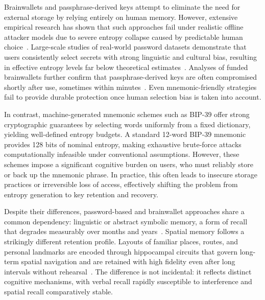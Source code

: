 \documentclass[journal,article,submit,pdftex,moreauthors]{Definitions/mdpi}
\newcommand{\add}[1]{#1}
\newcommand{\remove}[1]{}
\newcommand{\add}[1]{\added{#1}}
\newcommand{\remove}[1]{\deleted{#1}}
\begin{document}
Brainwallets and passphrase-derived keys attempt to eliminate the need for external storage by relying entirely on human memory. However, extensive empirical research has shown that such approaches fail under realistic offline attacker models due to severe entropy collapse caused by predictable human choice~\cite{Bonneau2012,Vasek2017}. Large-scale studies of real-world password datasets demonstrate that users consistently select secrets with strong linguistic and cultural bias, resulting in effective entropy levels far below theoretical estimates~\cite{Bonneau2012,Kuo2006}. Analyses of funded brainwallets further confirm that passphrase-derived keys are often compromised shortly after use, sometimes within minutes~\cite{Vasek2017,Yang2016}. Even mnemonic-friendly strategies fail to provide durable protection once human selection bias is taken into account.

In contrast, machine-generated mnemonic schemes such as BIP-39 offer strong cryptographic guarantees by selecting words uniformly from a fixed dictionary, yielding well-defined entropy budgets. A standard 12-word BIP-39 mnemonic provides 128 bits of nominal entropy, making exhaustive brute-force attacks computationally infeasible under conventional assumptions. However, these schemes impose a significant cognitive burden on users, who must reliably store or back up the mnemonic phrase. In practice, this often leads to insecure storage practices or irreversible loss of access, effectively shifting the problem from entropy generation to key retention and recovery.

\remove{A key limitation shared by most existing mnemonic systems is their dependence on linguistic or abstract symbolic memory, which is known to be fragile and error-prone over long time horizons~\cite{Pals2018,Akaygun2014}. In contrast, decades of research in cognitive psychology and neuroscience have established that humans possess a robust capacity for spatial memory. Spatial representations are encoded, organized, and retrieved using dedicated cognitive mechanisms centered around landmarks and reference frames, and are retained accurately even after long periods without rehearsal~\cite{Montello1998,McNamara2003,McNamara2012}. Neurobiological evidence further supports this distinction: the hippocampus plays a central role in both spatial navigation and long-term memory formation, suggesting a deep functional link between spatial awareness and memory encoding~\cite{McNaughton1991}.}\add{Despite their differences, password-based and brainwallet approaches share a common dependency: linguistic or abstract symbolic memory, a form of recall that degrades measurably over months and years~\cite{Pals2018,Akaygun2014}. Spatial memory follows a strikingly different retention profile. Layouts of familiar places, routes, and personal landmarks are encoded through hippocampal circuits that govern long-term spatial navigation and are retained with high fidelity even after long intervals without rehearsal~\cite{Montello1998,McNamara2003,McNamara2012,McNaughton1991}. The difference is not incidental: it reflects distinct cognitive mechanisms, with verbal recall rapidly susceptible to interference and spatial recall comparatively stable.}
\end{document}
